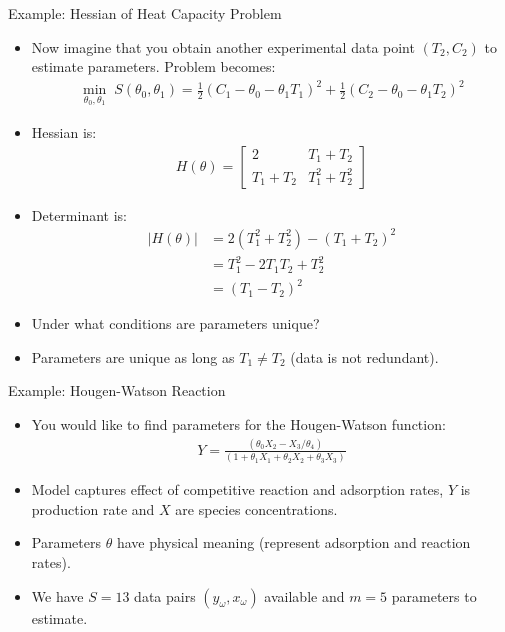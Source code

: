\documentclass[handout,9pt]{beamer}
\begin{document}
%
\begin{frame}{Example: Hessian of Heat Capacity Problem}

\begin{itemize}
\setlength{\itemsep}{10pt}
\item Now imagine that you obtain another experimental data point $(T_2,C_2)$ to estimate parameters. Problem becomes: 
\begin{align*}
\min_{\theta_0,\theta_1} \; S(\theta_0,\theta_1)=\frac{1}{2}(C_1-\theta_0-\theta_1T_1)^2+\frac{1}{2}(C_2-\theta_0-\theta_1T_2)^2
\end{align*}
\item Hessian is:
\begin{align*}
H(\theta)=\left[\begin{array}{cc}2&T_1+T_2\\ T_1+T_2 & T_1^2+T_2^2\end{array}\right]
\end{align*}
\item Determinant is:
\begin{align*}
|H(\theta)|&=2(T_1^2+T_2^2)-(T_1+T_2)^2\\
&=T_1^2-2T_1T_2+T_2^2\\
&=(T_1-T_2)^2
\end{align*}
\item Under what conditions are parameters unique? 
\pause
\item Parameters are unique as long as $T_1\neq T_2$ (data is not redundant). 
\end{itemize}

\end{frame}


%
\begin{frame}{Example: Hougen-Watson Reaction}

\begin{itemize}
\item You would like to find parameters for the Hougen-Watson function:
\begin{align*}
Y=\frac{(\theta_0X_2-X_3/\theta_4)}{(1+\theta_1X_1+\theta_2X_2+\theta_3X_3)}
\end{align*}
\item Model captures effect of competitive reaction and adsorption rates, $Y$ is production rate and $X$ are species concentrations. 
\item Parameters $\theta$ have physical meaning (represent adsorption and reaction rates). 
\item We have $S=13$ data pairs $(y_\omega,x_\omega)$ available and $m=5$ parameters to estimate. 
\end{itemize}


\end{frame}
\end{document}
